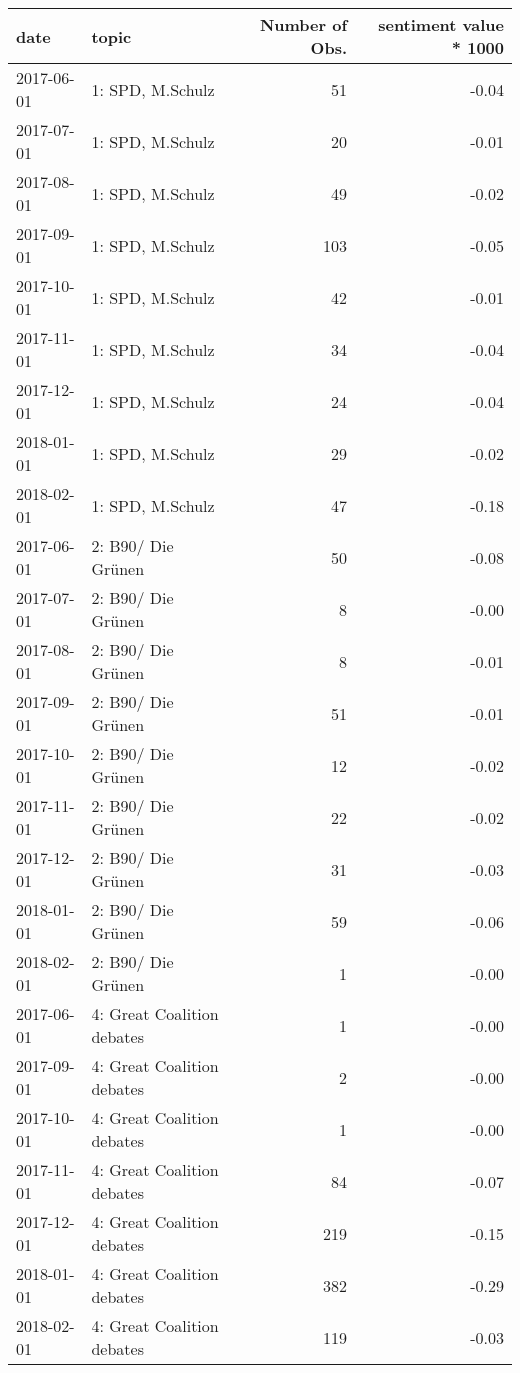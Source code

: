 \begin{adjustbox}{width=\textwidth}
\begin{tabular}{llrr}
  \hline
date & topic & Number of Obs. & sentiment value * 1000 \\ 
  \hline
2017-06-01 & 1: SPD, M.Schulz &  51 & -0.04 \\ 
  2017-07-01 & 1: SPD, M.Schulz &  20 & -0.01 \\ 
  2017-08-01 & 1: SPD, M.Schulz &  49 & -0.02 \\ 
  2017-09-01 & 1: SPD, M.Schulz & 103 & -0.05 \\ 
  2017-10-01 & 1: SPD, M.Schulz &  42 & -0.01 \\ 
  2017-11-01 & 1: SPD, M.Schulz &  34 & -0.04 \\ 
  2017-12-01 & 1: SPD, M.Schulz &  24 & -0.04 \\ 
  2018-01-01 & 1: SPD, M.Schulz &  29 & -0.02 \\ 
  2018-02-01 & 1: SPD, M.Schulz &  47 & -0.18 \\ 
  2017-06-01 & 2: B90/ Die Grünen &  50 & -0.08 \\ 
  2017-07-01 & 2: B90/ Die Grünen &   8 & -0.00 \\ 
  2017-08-01 & 2: B90/ Die Grünen &   8 & -0.01 \\ 
  2017-09-01 & 2: B90/ Die Grünen &  51 & -0.01 \\ 
  2017-10-01 & 2: B90/ Die Grünen &  12 & -0.02 \\ 
  2017-11-01 & 2: B90/ Die Grünen &  22 & -0.02 \\ 
  2017-12-01 & 2: B90/ Die Grünen &  31 & -0.03 \\ 
  2018-01-01 & 2: B90/ Die Grünen &  59 & -0.06 \\ 
  2018-02-01 & 2: B90/ Die Grünen &   1 & -0.00 \\ 
  2017-06-01 & 4: Great Coalition debates &   1 & -0.00 \\ 
  2017-09-01 & 4: Great Coalition debates &   2 & -0.00 \\ 
  2017-10-01 & 4: Great Coalition debates &   1 & -0.00 \\ 
  2017-11-01 & 4: Great Coalition debates &  84 & -0.07 \\ 
  2017-12-01 & 4: Great Coalition debates & 219 & -0.15 \\ 
  2018-01-01 & 4: Great Coalition debates & 382 & -0.29 \\ 
  2018-02-01 & 4: Great Coalition debates & 119 & -0.03 \\ 

\end{tabular}
\end{adjustbox}
